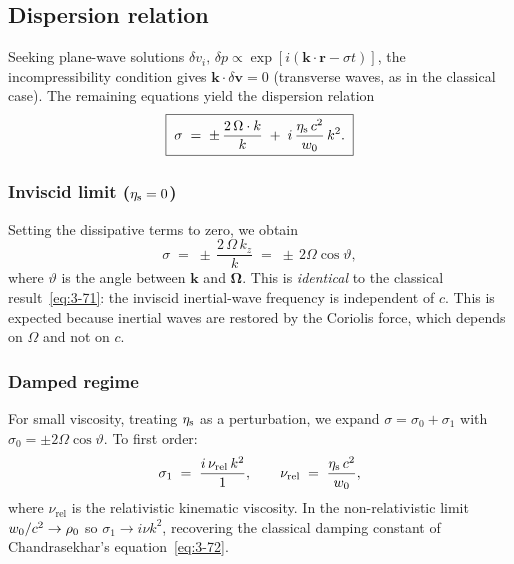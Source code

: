 \subsection{Dispersion relation}

Seeking plane-wave solutions
$\delta v_{i},\,\delta p \propto \exp[i(\mathbf{k}\cdot\mathbf{r} - \sigma t)]$,
the incompressibility condition gives
$\mathbf{k}\cdot\delta\mathbf{v} = 0$ (transverse waves, as in the
classical case).  The remaining equations yield the dispersion relation
\begin{equation}\label{eq:rel-3-22}
  \boxed{\;
  \sigma
  \;=\;
  \pm\,\frac{2\,\Omega\cdot k}{k}
  \;+\;
  i\,\frac{\eta_{\mathrm{s}}\,c^{2}}{w_{0}}\,k^{2}.
  \;}
\end{equation}

\subsubsection*{Inviscid limit ($\eta_{\mathrm{s}} = 0$)}

Setting the dissipative terms to zero, we obtain
\begin{equation}\label{eq:rel-3-23}
  \sigma
  \;=\;
  \pm\,\frac{2\,\Omega\,k_{z}}{k}
  \;=\;
  \pm\,2\Omega\cos\vartheta,
\end{equation}
where $\vartheta$ is the angle between $\mathbf{k}$ and
$\boldsymbol{\Omega}$.  This is \emph{identical} to the classical
result~\eqref{eq:3-71}: the inviscid inertial-wave frequency is
independent of $c$.  This is expected because inertial waves are
restored by the Coriolis force, which depends on $\Omega$ and not on
$c$.

\subsubsection*{Damped regime}

For small viscosity, treating $\eta_{\mathrm{s}}$ as a
perturbation, we expand $\sigma = \sigma_{0} + \sigma_{1}$ with
$\sigma_{0} = \pm 2\Omega\cos\vartheta$.  To first order:
\begin{equation}\label{eq:rel-3-24}
  \sigma_{1}
  \;=\;
  \frac{i\,\nu_{\mathrm{rel}}\,k^{2}}
       {1},
  \qquad
  \nu_{\mathrm{rel}}
  \;=\;
  \frac{\eta_{\mathrm{s}}\,c^{2}}{w_{0}},
\end{equation}
where $\nu_{\mathrm{rel}}$ is the relativistic kinematic viscosity.
In the non-relativistic limit
$w_{0}/c^{2} \to \rho_{0}$ so
$\sigma_{1} \to i\nu k^{2}$, recovering the classical damping
constant of Chandrasekhar's equation~\eqref{eq:3-72}.

